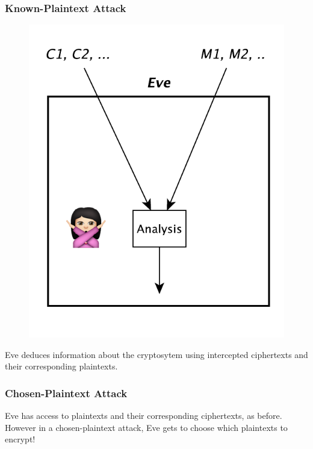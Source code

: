 \documentclass{beamer}
\newcommand{\<}{\langle}
\renewcommand{\>}{\rangle}
\begin{document}
\begin{frame}
\frametitle{Known-Plaintext Attack}

\begin{figure}
\includegraphics[scale=.4]{IMG/attack2.pdf}
\end{figure}

Eve deduces information about the cryptosytem using intercepted ciphertexts and their corresponding plaintexts. 
\end{frame}

\begin{frame}
\frametitle{Chosen-Plaintext Attack}

Eve has access to plaintexts and their corresponding ciphertexts, as before. However in a chosen-plaintext attack, Eve gets to choose which plaintexts to encrypt!
\end{frame}
\end{document}
